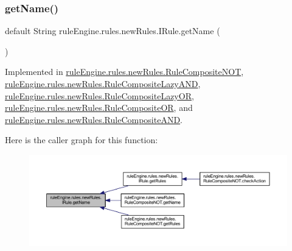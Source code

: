 \subsubsection{\texorpdfstring{get\+Name()}{getName()}}
{\footnotesize\ttfamily default String rule\+Engine.\+rules.\+new\+Rules.\+I\+Rule.\+get\+Name (\begin{DoxyParamCaption}{ }\end{DoxyParamCaption})\hspace{0.3cm}{\ttfamily [inline]}}



Implemented in \mbox{\hyperlink{classrule_engine_1_1rules_1_1new_rules_1_1_rule_composite_n_o_t_a1d11d1d08a50f98b26109859ae453aaa}{rule\+Engine.\+rules.\+new\+Rules.\+Rule\+Composite\+N\+OT}}, \mbox{\hyperlink{classrule_engine_1_1rules_1_1new_rules_1_1_rule_composite_lazy_a_n_d_a1fabc2dad0cccb638ee3154918c90f0d}{rule\+Engine.\+rules.\+new\+Rules.\+Rule\+Composite\+Lazy\+A\+ND}}, \mbox{\hyperlink{classrule_engine_1_1rules_1_1new_rules_1_1_rule_composite_lazy_o_r_a54bdce8894ca26eb101d0332686fecf7}{rule\+Engine.\+rules.\+new\+Rules.\+Rule\+Composite\+Lazy\+OR}}, \mbox{\hyperlink{classrule_engine_1_1rules_1_1new_rules_1_1_rule_composite_o_r_a5188ec90f3d18b5fc6f2f7eea8ece5c6}{rule\+Engine.\+rules.\+new\+Rules.\+Rule\+Composite\+OR}}, and \mbox{\hyperlink{classrule_engine_1_1rules_1_1new_rules_1_1_rule_composite_a_n_d_a1807d41373e80bf5e2778e81a4148b7b}{rule\+Engine.\+rules.\+new\+Rules.\+Rule\+Composite\+A\+ND}}.

Here is the caller graph for this function\+:
\nopagebreak
\begin{figure}[H]
\begin{center}
\leavevmode
\includegraphics[width=350pt]{interfacerule_engine_1_1rules_1_1new_rules_1_1_i_rule_a99e11d165ca863908c6e985a79917067_icgraph}
\end{center}
\end{figure}
\mbox{\label{interfacerule_engine_1_1rules_1_1new_rules_1_1_i_rule_a9d1c8d3f07b6ade794f60453449486c0}} 
